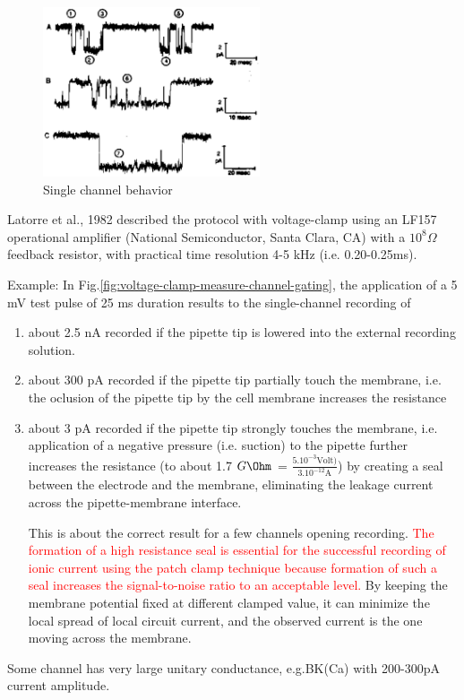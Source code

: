 \begin{figure}[hbt]
  \centerline{\includegraphics[height=5cm,
    angle=0]{./images/ion_channel.eps}}
\caption{Single channel behavior}
\label{fig:single_behavior}
\end{figure}

Latorre et al., 1982 described the protocol with voltage-clamp using an LF157
operational amplifier (National Semiconductor, Santa Clara, CA) with a
$10^8\Omega$ feedback resistor, with practical time resolution 4-5 kHz (i.e.
0.20-0.25ms).


Example: In Fig.\ref{fig:voltage-clamp-measure-channel-gating}, the
application of a 5 mV test pulse of 25 ms duration results to the
single-channel recording of
  \begin{enumerate}
    \item about 2.5 nA recorded if the pipette tip is lowered into the external
    recording solution.

    \item about 300 pA recorded if the pipette tip partially touch the membrane,
    i.e. the oclusion of the pipette tip by the cell membrane increases the
    resistance

    \item about 3 pA recorded if the pipette tip strongly touches the membrane,
    i.e. application of a negative pressure (i.e.
    suction) to the pipette further increases the resistance (to about 1.7
    $G\Ohm$ = $\frac{5.10^{-3} \text{Volt})}{3.10^{-12} \text{A}}$) by creating
    a seal between the electrode and the membrane, eliminating the leakage
    current across the pipette-membrane interface.

   This is about the correct result for a few channels opening recording.
   \textcolor{red}{The formation of a high resistance seal is essential for the
   successful recording of ionic current using the patch clamp
technique because formation of such a seal increases the signal-to-noise ratio
to an acceptable level.} By keeping the membrane potential fixed at different
clamped value, it can minimize the local spread of local circuit current, and
the observed current is the one moving across the membrane.

\end{enumerate}
Some channel has very large unitary conductance, e.g.BK(Ca) with 200-300pA
current amplitude.

